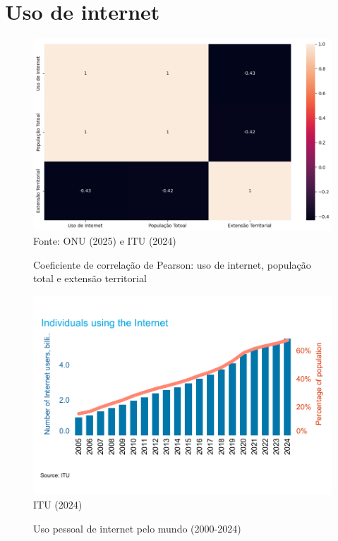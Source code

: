 \section{Uso de internet}

\begin{figure}[ht]
    \centering
    \caption{Coeficiente de correlação de Pearson: uso de internet, população total e extensão territorial}
    \includegraphics[width=1\linewidth]{figuras/internet/correlacao.png}
    \label{fig:intert_correlacao}
    \footnotesize{Fonte: ONU (2025) e ITU (2024)}
\end{figure}

\begin{figure}[ht]
    \centering
    \caption{Uso pessoal de internet pelo mundo (2000-2024)}
    \includegraphics[width=1\linewidth]{figuras/internet/individuals_using_internet_itu.png}
    \label{fig:individuals_using_internet_itu.png}
    \footnotesize{ITU (2024)}
\end{figure}

